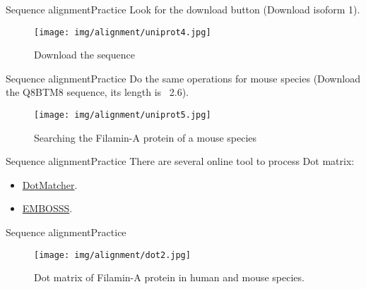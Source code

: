 \documentclass[10pt]{beamer}
\newcommand{\1}{
	\setbeamertemplate{background}{
		\texttt{[image: img/1]}
		\tikz[overlay] \fill[fill opacity=0.75,fill=white] (0,0) rectangle (-\paperwidth,\paperheight);
	}
}
\begin{document}
\begin{frame}{Sequence alignment}{Practice}
Look for the download button (Download isoform 1).
\begin{figure}[]
 \centering
    \texttt{[image: img/alignment/uniprot4.jpg]}
    \label{img:uniprot2}
    \caption{Download the sequence}
\end{figure}
\end{frame}

\begin{frame}{Sequence alignment}{Practice}
Do the same operations for mouse species (Download the Q8BTM8 sequence, its length is \string ~2.6). 
\begin{figure}[]
 \centering
    \texttt{[image: img/alignment/uniprot5.jpg]}
    \label{img:uniprot2}
    \caption{Searching the Filamin-A protein of a mouse species}
\end{figure}
\end{frame}

\begin{frame}{Sequence alignment}{Practice}
There are several online tool to process Dot matrix: 
\begin{itemize}
    \item  \href{http://bioinfo.nhri.org.tw/cgi-bin/emboss/dotmatcher}{DotMatcher}. 
    \item  \href{https://www.ebi.ac.uk/Tools/seqstats/emboss_dotmatcher/}{EMBOSSS}.
\end{itemize}
\end{frame}


\begin{frame}{Sequence alignment}{Practice}
\begin{figure}[]
 \centering
    \texttt{[image: img/alignment/dot2.jpg]}
    \label{img:uniprot2}
    \caption{Dot matrix of Filamin-A protein in human and mouse species.}
\end{figure}
\end{frame}
\end{document}
